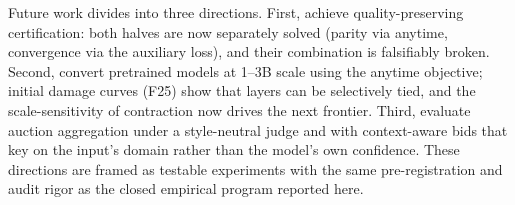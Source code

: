 Future work divides into three directions. First, achieve quality-preserving certification: both halves are now separately solved (parity via anytime, convergence via the auxiliary loss), and their combination is falsifiably broken. Second, convert pretrained models at 1–3B scale using the anytime objective; initial damage curves (F25) show that layers can be selectively tied, and the scale-sensitivity of contraction now drives the next frontier. Third, evaluate auction aggregation under a style-neutral judge and with context-aware bids that key on the input's domain rather than the model's own confidence. These directions are framed as testable experiments with the same pre-registration and audit rigor as the closed empirical program reported here.

